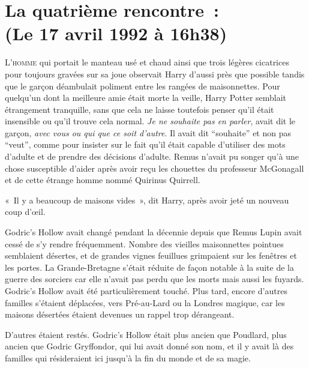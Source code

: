 
\section[La quatrième rencontre~:\\
(Le 17 avril 1992 à 16h38)]{La quatrième rencontre~:\\
(Le 17 avril 1992 à 16h38)\protect\footnotemark}

\lettrine{L}{'homme} qui portait le manteau usé et chaud ainsi que trois légères cicatrices pour toujours gravées sur sa joue observait Harry d'aussi près que possible tandis que le garçon déambulait poliment entre les rangées de maisonnettes. Pour quelqu'un dont la meilleure amie était morte la veille, Harry Potter semblait étrangement tranquille, sans que cela ne laisse toutefois penser qu'il était insensible ou qu'il trouve cela normal. \emph{Je ne souhaite pas en parler}, avait dit le garçon, \emph{avec vous ou qui que ce soit d'autre}. Il avait dit “souhaite” et non pas “veut”, comme pour insister sur le fait qu'il était capable d'utiliser des mots d'adulte et de prendre des décisions d'adulte. Remus n'avait pu songer qu'à une chose susceptible d'aider après avoir reçu les chouettes du professeur McGonagall et de cette étrange homme nommé Quirinus Quirrell.

«~Il y a beaucoup de maisons vides~», dit Harry, après avoir jeté un nouveau coup d'œil.

Godric's Hollow avait changé pendant la décennie depuis que Remus Lupin avait cessé de s'y rendre fréquemment. Nombre des vieilles maisonnettes pointues semblaient désertes, et de grandes vignes feuillues grimpaient sur les fenêtres et les portes. La Grande-Bretagne s'était réduite de façon notable à la suite de la guerre des sorciers car elle n'avait pas perdu que les morts mais aussi les fuyards. Godric's Hollow avait été particulièrement touché. Plus tard, encore d'autres familles s'étaient déplacées, vers Pré-au-Lard ou la Londres magique, car les maisons désertées étaient devenues un rappel trop dérangeant.

D'autres étaient restés. Godric's Hollow était plus ancien que Poudlard, plus ancien que Godric Gryffondor, qui lui avait donné son nom, et il y avait là des familles qui résideraient ici jusqu'à la fin du monde et de sa magie.

